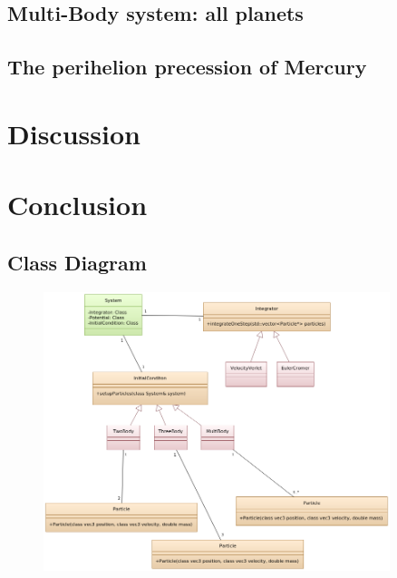 \documentclass[10pt,a4paper]{amsart}
\begin{document}
\subsection{Multi-Body system: all planets}

\subsection{The perihelion precession of Mercury}

\section{Discussion}

\section{Conclusion}

\pagebreak

\begin{appendix}

\section{Class Diagram}
\label{app:classdiagram}

\begin{figure}[ht]
	\centering
	\includegraphics[width=0.9\textwidth]{../figures/classdiagram.png}
\end{figure}

\end{appendix}
\end{document}
